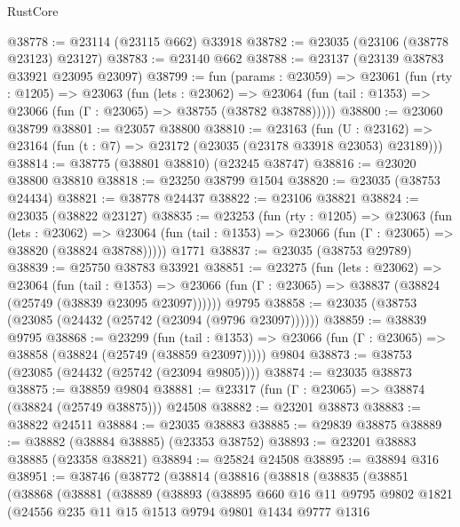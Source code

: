\begin{lexlean}{RustCore}
\begin{coremodule}
@38778 := @23114 (@23115 @662) @33918
@38782 := @23035 (@23106 (@38778 @23123) @23127)
@38783 := @23140 @662
@38788 := @23137 (@23139 @38783 @33921 @23095 @23097)
@38799 := fun (params : @23059) =>
  @23061
    (fun (rty : @1205) =>
    @23063
      (fun (lets : @23062) =>
      @23064 (fun (tail : @1353) => @23066 (fun (Γ : @23065) => @38755 (@38782 @38788)))))
@38800 := @23060 @38799
@38801 := @23057 @38800
@38810 := @23163
    (fun (U : @23162) => @23164 (fun (t : @7) => @23172 (@23035 (@23178 @33918 @23053) @23189)))
@38814 := @38775 (@38801 @38810) (@23245 @38747)
@38816 := @23020 @38800 @38810
@38818 := @23250 @38799 @1504
@38820 := @23035 (@38753 @24434)
@38821 := @38778 @24437
@38822 := @23106 @38821
@38824 := @23035 (@38822 @23127)
@38835 := @23253
    (fun (rty : @1205) =>
    @23063
      (fun (lets : @23062) =>
      @23064 (fun (tail : @1353) => @23066 (fun (Γ : @23065) => @38820 (@38824 @38788)))))
    @1771
@38837 := @23035 (@38753 @29789)
@38839 := @25750 @38783 @33921
@38851 := @23275
    (fun (lets : @23062) =>
    @23064
      (fun (tail : @1353) =>
      @23066 (fun (Γ : @23065) => @38837 (@38824 (@25749 (@38839 @23095 @23097))))))
    @9795
@38858 := @23035 (@38753 (@23085 (@24432 (@25742 (@23094 (@9796 @23097))))))
@38859 := @38839 @9795
@38868 := @23299
    (fun (tail : @1353) => @23066 (fun (Γ : @23065) => @38858 (@38824 (@25749 (@38859 @23097)))))
    @9804
@38873 := @38753 (@23085 (@24432 (@25742 (@23094 @9805))))
@38874 := @23035 @38873
@38875 := @38859 @9804
@38881 := @23317 (fun (Γ : @23065) => @38874 (@38824 (@25749 @38875))) @24508
@38882 := @23201 @38873
@38883 := @38822 @24511
@38884 := @23035 @38883
@38885 := @29839 @38875
@38889 := @38882 (@38884 @38885) (@23353 @38752)
@38893 := @23201 @38883 @38885 (@23358 @38821)
@38894 := @25824 @24508
@38895 := @38894 @316
@38951 := @38746
    (@38772
      (@38814
        (@38816
          (@38818
            (@38835
              (@38851
                (@38868
                  (@38881
                    (@38889
                      (@38893
                        (@38895
                          @660
                          @16
                          @11
                          @9795
                          @9802
                          @1821
                          (@24556
                            @235
                            @11
                            @15
                            @1513
                            @9794
                            @9801
                            @1434
                            @9777
                            @1316

\end{coremodule}
\end{lexlean}
